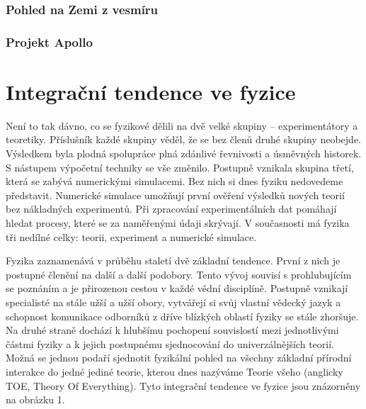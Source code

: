       
      \subsubsection{Pohled na Zemi z vesmíru}\label{fyz:IchapIIsecIVssecIVsssecI}  
      \subsubsection{Projekt Apollo}\label{fyz:IchapIIsecIVssecIVsssecII}    
  \section{Integrační tendence ve fyzice}\label{fyz:IchapIIsecV}
    Není to tak dávno, co se fyzikové dělili na dvě velké skupiny – experimentátory a teoretiky.
    Příslušník každé skupiny věděl, že se bez členů druhé skupiny neobejde. Výsledkem byla plodná
    spolupráce plná zdánlivé řevnivosti a úsměvných historek. S nástupem výpočetní techniky se vše
    změnilo. Postupně vznikala skupina třetí, která se zabývá numerickými simulacemi. Bez nich si
    dnes fyziku nedovedeme představit. Numerické simulace umožňují první ověření výsledků nových
    teorií bez nákladných experimentů. Při zpracování experimentálních dat pomáhají hledat procesy,
    které se za naměřenými údaji skrývají. V současnosti má fyzika tři nedílné celky: teorii,
    experiment a numerické simulace. 
    
    Fyzika zaznamenává v průběhu staletí dvě základní tendence. První z nich je postupné členění na
    další a další podobory. Tento vývoj souvisí s prohlubujícím se poznáním a je přirozenou cestou v
    každé vědní disciplíně. Postupně vznikají specialisté na stále užší a užší obory, vytvářejí si
    svůj vlastní vědecký jazyk a schopnost komunikace odborníků z dříve blízkých oblastí fyziky se
    stále zhoršuje. Na druhé straně dochází k hlubšímu pochopení souvislostí mezi jednotlivými
    částmi fyziky a k jejich postupnému sjednocování do univerzálnějších teorií. Možná se jednou
    podaří sjednotit fyzikální pohled na všechny základní přírodní interakce do jedné jediné teorie,
    kterou dnes nazýváme Teorie všeho (anglicky TOE, Theory Of Everything). Tyto integrační tendence
    ve fyzice jsou znázorněny na obrázku 1. 

    
